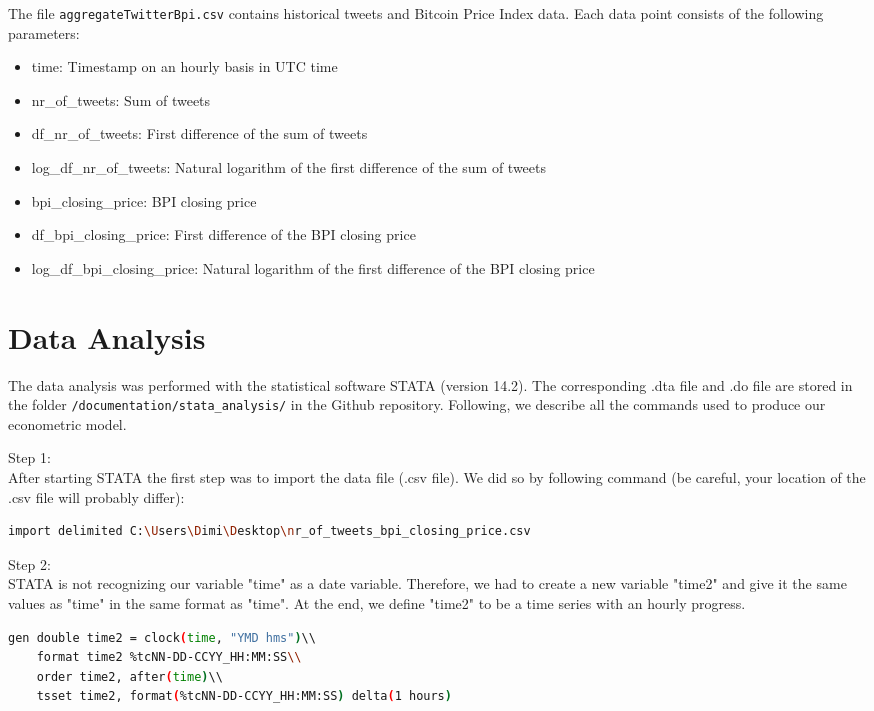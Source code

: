 \documentclass[a4paper,12pt]{article}
\begin{document}
\begin{spacing}{1.2}
The file \verb|aggregateTwitterBpi.csv| contains historical tweets and Bitcoin Price Index data. Each data point consists of the following parameters:
\begin{itemize}
    \item time: Timestamp on an hourly basis in UTC time
    \item {nr\_of\_tweets}: Sum of tweets
    \item {df\_nr\_of\_tweets}: First difference of the sum of tweets
    \item {log\_df\_nr\_of\_tweets}: Natural logarithm of the first difference of the sum of tweets
    \item {bpi\_closing\_price}: BPI closing price
    \item {df\_bpi\_closing\_price}: First difference of the BPI closing price
    \item {log\_df\_bpi\_closing\_price}: Natural logarithm of the first difference of the BPI closing price
\end{itemize}

\clearpage

\section{Data Analysis}
The data analysis was performed with the statistical software STATA (version 14.2). The corresponding .dta file and .do file are stored in the folder  \verb|/documentation/stata_analysis/| in the Github repository. Following, we describe all the commands used to produce our econometric model.

Step 1:\\
After starting STATA the first step was to import the data file (.csv file). We did so by following command (be careful, your location of the .csv file will probably differ):\\
\begin{lstlisting}[language=bash]
    import delimited C:\Users\Dimi\Desktop\nr_of_tweets_bpi_closing_price.csv
\end{lstlisting}

Step 2:\\
STATA is not recognizing our variable "time" as a date variable. Therefore, we had to create a new variable "time2" and give it the same values as "time" in the same format as "time". At the end, we define "time2" to be a time series with an hourly progress.\\
	\begin{lstlisting}[language=bash]
	gen double time2 = clock(time, "YMD hms")\\
	format time2 %tcNN-DD-CCYY_HH:MM:SS\\
	order time2, after(time)\\
	tsset time2, format(%tcNN-DD-CCYY_HH:MM:SS) delta(1 hours)
	\end{lstlisting}


\end{spacing}
\end{document}
